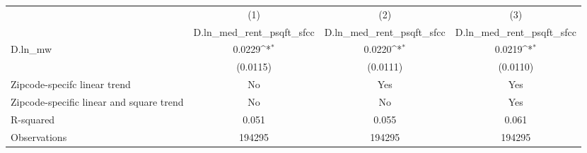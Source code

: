 {
\def\sym#1{\ifmmode^{#1}\else\(^{#1}\)\fi}
\begin{tabular}{l*{3}{c}}
\hline\hline
          &\multicolumn{1}{c}{(1)}&\multicolumn{1}{c}{(2)}&\multicolumn{1}{c}{(3)}\\
          &\multicolumn{1}{c}{D.ln\_med\_rent\_psqft\_sfcc}&\multicolumn{1}{c}{D.ln\_med\_rent\_psqft\_sfcc}&\multicolumn{1}{c}{D.ln\_med\_rent\_psqft\_sfcc}\\
\hline
D.ln\_mw   &   0.0229\sym{*}  &   0.0220\sym{*}  &   0.0219\sym{*}  \\
          & (0.0115)         & (0.0111)         & (0.0110)         \\
\hline
Zipcode-specifc linear trend&       No         &      Yes         &      Yes         \\
Zipcode-specific linear and square trend&       No         &       No         &      Yes         \\
R-squared &    0.051         &    0.055         &    0.061         \\
Observations&   194295         &   194295         &   194295         \\
\hline\hline
\end{tabular}
}

